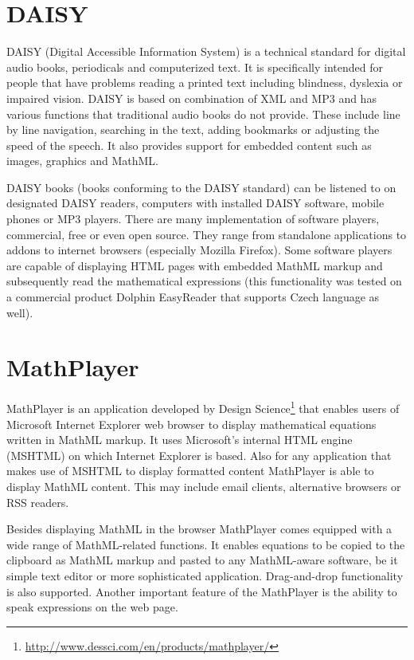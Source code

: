 \documentclass[11pt,oneside,final]{fithesis2}
\begin{document}
\section{DAISY}
DAISY (Digital Accessible Information System) is a technical standard for digital audio books, periodicals and computerized text. It is specifically intended for people that have problems reading a printed text including blindness, dyslexia or impaired vision. DAISY is based on combination of XML and MP3 and has various functions that traditional audio books do not provide. These include line by line navigation, searching in the text, adding bookmarks or adjusting the speed of the speech. It also provides support for embedded content such as images, graphics and MathML. 

DAISY books (books conforming to the DAISY standard) can be listened to on designated DAISY readers, computers with installed DAISY software, mobile phones or MP3 players. There are many implementation of software players, commercial, free or even open source. They range from standalone applications to addons to internet browsers (especially Mozilla Firefox). Some software players are capable of displaying HTML pages with embedded MathML markup and subsequently read the mathematical expressions (this functionality was tested on a commercial product Dolphin EasyReader that supports Czech language as well).   

\section{MathPlayer}
\label{mathml:mathplayer}
MathPlayer is an application developed by Design Science\footnote{\url{http://www.dessci.com/en/products/mathplayer/}} that enables users of Microsoft Internet Explorer web browser to display mathematical equations written in MathML markup. It uses Microsoft's internal HTML engine (MSHTML) on which Internet Explorer is based. Also for any application that makes use of MSHTML to display formatted content MathPlayer is able to display MathML content. This may include email clients, alternative browsers or RSS readers. 

Besides displaying MathML in the browser MathPlayer comes equipped with a wide range of MathML-related functions. It enables equations to be copied to the clipboard as MathML markup and pasted to any MathML-aware software, be it simple text editor or more sophisticated application. Drag-and-drop functionality is also supported. Another important feature of the MathPlayer is the ability to speak expressions on the web page.
\end{document}
